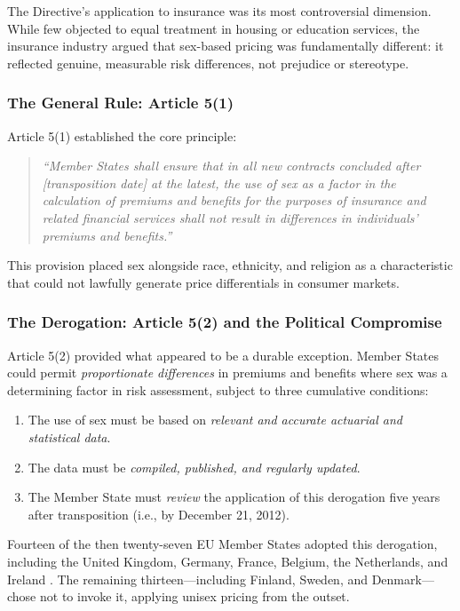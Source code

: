 \documentclass[12pt,a4paper]{article}
\begin{document}
The Directive's application to insurance was its most controversial dimension. While few objected to equal treatment in housing or education services, the insurance industry argued that sex-based pricing was fundamentally different: it reflected genuine, measurable risk differences, not prejudice or stereotype.

\subsubsection{The General Rule: Article 5(1)}

Article 5(1) established the core principle:

\begin{quote}
\emph{``Member States shall ensure that in all new contracts concluded after [transposition date] at the latest, the use of sex as a factor in the calculation of premiums and benefits for the purposes of insurance and related financial services shall not result in differences in individuals' premiums and benefits.''}
\end{quote}

This provision placed sex alongside race, ethnicity, and religion as a characteristic that could not lawfully generate price differentials in consumer markets.

\subsubsection{The Derogation: Article 5(2) and the Political Compromise}

Article 5(2) provided what appeared to be a durable exception. Member States could permit \emph{proportionate differences} in premiums and benefits where sex was a determining factor in risk assessment, subject to three cumulative conditions:

\begin{enumerate}
  \item The use of sex must be based on \emph{relevant and accurate actuarial and statistical data}.
  \item The data must be \emph{compiled, published, and regularly updated}.
  \item The Member State must \emph{review} the application of this derogation five years after transposition (i.e., by December 21, 2012).
\end{enumerate}

Fourteen of the then twenty-seven EU Member States adopted this derogation, including the United Kingdom, Germany, France, Belgium, the Netherlands, and Ireland \cite{directive2004}. The remaining thirteen---including Finland, Sweden, and Denmark---chose not to invoke it, applying unisex pricing from the outset.
\end{document}
